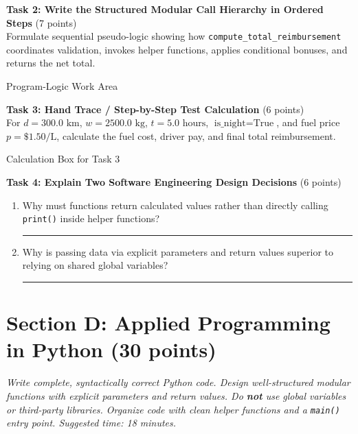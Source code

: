 \documentclass[11pt,a4paper]{article}
\begin{document}
\vspace{0.5mm}
\textbf{Task 2: Write the Structured Modular Call Hierarchy in Ordered Steps} (7 points)\\
Formulate sequential pseudo-logic showing how \texttt{compute\_total\_reimbursement} coordinates validation, invokes helper functions, applies conditional bonuses, and returns the net total.

\begin{answerbox}[height=4.5cm]{Program-Logic Work Area}
\end{answerbox}

\vspace{0.5mm}
\textbf{Task 3: Hand Trace / Step-by-Step Test Calculation} (6 points)\\
For $d = 300.0\text{ km}$, $w = 2500.0\text{ kg}$, $t = 5.0\text{ hours}$, $\text{is\_night} = \text{True}$, and fuel price $p = \$1.50/\text{L}$, calculate the fuel cost, driver pay, and final total reimbursement.

\begin{answerbox}[height=3.0cm]{Calculation Box for Task 3}
\end{answerbox}

\vspace{0.5mm}
\textbf{Task 4: Explain Two Software Engineering Design Decisions} (6 points)
\begin{enumerate}[label=\alph*),leftmargin=1.8em,itemsep=2pt]
  \item Why must functions return calculated values rather than directly calling \texttt{print()} inside helper functions?\\
  \rule{\linewidth}{0.4pt}
  \item Why is passing data via explicit parameters and return values superior to relying on shared global variables?\\
  \rule{\linewidth}{0.4pt}
\end{enumerate}

\newpage


\section*{Section D: Applied Programming in Python \hfill \normalsize\normalfont(30 points)}
\textit{Write complete, syntactically correct Python code. Design well-structured modular functions with explicit parameters and return values. Do \textbf{not} use global variables or third-party libraries. Organize code with clean helper functions and a \texttt{main()} entry point. Suggested time: 18 minutes.}
\end{document}
